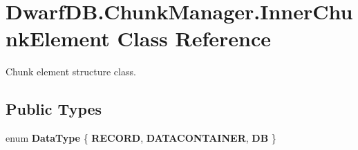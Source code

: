 \hypertarget{class_dwarf_d_b_1_1_chunk_manager_1_1_inner_chunk_element}{
\section{DwarfDB.ChunkManager.InnerChunkElement Class Reference}
\label{class_dwarf_d_b_1_1_chunk_manager_1_1_inner_chunk_element}
}


Chunk element structure class.  


\subsection*{Public Types}
\begin{DoxyCompactItemize}
\item 
enum {\bfseries DataType} \{ {\bfseries RECORD}, 
{\bfseries DATACONTAINER}, 
{\bfseries DB}
 \}
\end{DoxyCompactItemize}
